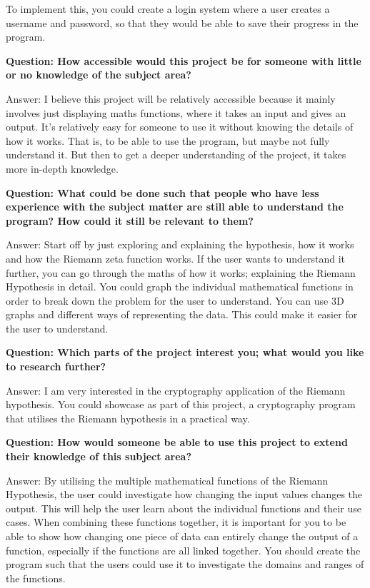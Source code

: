 \documentclass{article}
\begin{document}
To implement this, you could create a login system where a user creates a username and password, so that they would be able to save their progress in the program.

\textbf{Question: How accessible would this project be for someone with little or no knowledge of the subject area?}

Answer: I believe this project will be relatively accessible because it mainly involves just displaying maths functions, where it takes an input and gives an output. It's relatively easy for someone to use it without knowing the details of how it works. That is, to be able to use the program, but maybe not fully understand it. But then to get a deeper understanding of the project, it takes more in-depth knowledge.

\textbf{Question: What could be done such that people who have less experience with the subject matter are still able to understand the program? How could it still be relevant to them?}

Answer: Start off by just exploring and explaining the hypothesis, how it works and how the Riemann zeta function works. If the user wants to understand it further, you can go through the maths of how it works; explaining the Riemann Hypothesis in detail. You could graph the individual mathematical functions in order to break down the problem for the user to understand.  You can use 3D graphs and different ways of representing the data. This could make it easier for the user to understand.

\textbf{Question: Which parts of the project interest you; what would you like to research further?}

Answer: I am very interested in the cryptography application of the Riemann hypothesis. You could showcase as part of this project, a cryptography program that utilises the Riemann hypothesis in a practical way.

\textbf{Question: How would someone be able to use this project to extend their knowledge of this subject area?}

Answer: By utilising the multiple mathematical functions of the Riemann Hypothesis, the user could investigate how changing the input values changes the output. This will help the user learn about the individual functions and their use cases. When combining these functions together, it is important for you to be able to show how changing one piece of data can entirely change the output of a function, especially if the functions are all linked together. You should create the program such that the users could use it to investigate the domains and ranges of the functions.
\end{document}
